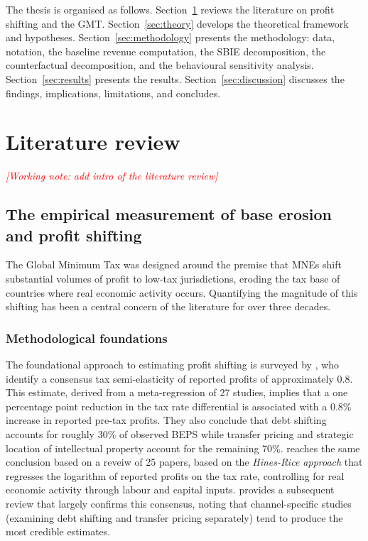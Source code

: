 \documentclass[11pt,a4paper]{article}
\newcommand{\workingnote}[1]{\ifworkingdoc\par\noindent\textcolor{red}{\textit{[Working note: #1]}}\par\fi}
\begin{document}
The thesis is organised as follows. Section~\ref{sec:literature} reviews the literature on profit shifting and the GMT. Section~\ref{sec:theory} develops the theoretical framework and hypotheses. Section~\ref{sec:methodology} presents the methodology: data, notation, the baseline revenue computation, the SBIE decomposition, the counterfactual decomposition, and the behavioural sensitivity analysis. Section~\ref{sec:results} presents the results. Section~\ref{sec:discussion} discusses the findings, implications, limitations, and concludes.

\newpage
\section{Literature review}\label{sec:literature}

\workingnote{add intro of the literature review}

\subsection{The empirical measurement of base erosion and profit shifting}\label{sec:beps}

The Global Minimum Tax was designed around the premise that MNEs shift substantial volumes of profit to low-tax jurisdictions, eroding the tax base of countries where real economic activity occurs. Quantifying the magnitude of this shifting has been a central concern of the literature for over three decades.

\subsubsection{Methodological foundations}

The foundational approach to estimating profit shifting is surveyed by \citet{heckemeyer2017}, who identify a consensus tax semi-elasticity of reported profits of approximately 0.8. This estimate, derived from a meta-regression of 27 studies, implies that a one percentage point reduction in the tax rate differential is associated with a 0.8\% increase in reported pre-tax profits. They also conclude that debt shifting accounts for roughly 30\% of observed BEPS while transfer pricing and strategic location of intellectual property account for the remaining 70\%. \citet{dharmapala2014} reaches the same conclusion based on a reveiw of 25 papers, based on the \emph{Hines-Rice approach} that regresses the logarithm of reported profits on the tax rate, controlling for real economic activity through labour and capital inputs. \citet{riedel2018} provides a subsequent review that largely confirms this consensus, noting that channel-specific studies (examining debt shifting and transfer pricing separately) tend to produce the most credible estimates.
\end{document}
